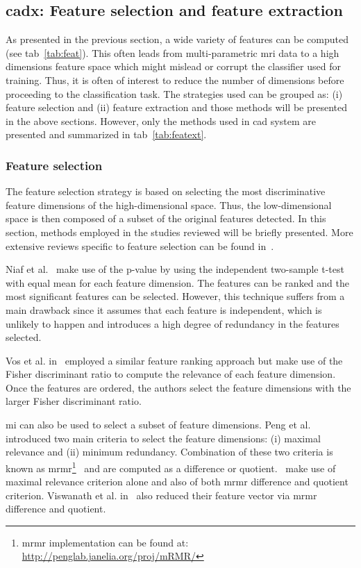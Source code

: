 \subsection{\ac{cadx}: Feature selection and feature extraction} \label{subsec:featureselectionextraction}

As presented in the previous section, a wide variety of features can be computed (see \ac{tab}~\ref{tab:feat}). This often leads from multi-parametric \ac{mri} data to a high dimensions feature space which might mislead or corrupt the classifier used for training. Thus, it is often of interest to reduce the number of dimensions before proceeding to the classification task. The strategies used can be grouped as: (i) feature selection and (ii) feature extraction and those methods will be presented in the above sections. However, only the methods used in \ac{cad} system are presented and summarized in \ac{tab}~\ref{tab:featext}.

\subsubsection{Feature selection}\label{subsubsec:featsel}

The feature selection strategy is based on selecting the most discriminative feature dimensions of the high-dimensional space. Thus, the low-dimensional space is then composed of a subset of the original features detected. In this section, methods employed in the studies reviewed will be briefly presented. More extensive reviews specific to feature selection can be found in~\cite{Saeys2007}.

Niaf et al.~\cite{Niaf2011,Niaf2012} make use of the p-value by using the independent two-sample t-test with equal mean for each feature dimension. The features can be ranked and the most significant features can be selected. However, this technique suffers from a main drawback since it assumes that each feature is independent, which is unlikely to happen and introduces a high degree of redundancy in the features selected.

Vos et al. in~\cite{Vos2012} employed a similar feature ranking approach but make use of the Fisher discriminant ratio to compute the relevance of each feature dimension. Once the features are ordered, the authors select the feature dimensions with the larger Fisher discriminant ratio.

\ac{mi} can also be used to select a subset of feature dimensions. Peng et al. introduced two main criteria to select the feature dimensions: (i) maximal relevance and (ii) minimum redundancy. Combination of these two criteria is known as \ac{mrmr}\footnote{\ac{mrmr} implementation can be found at: \url{http://penglab.janelia.org/proj/mRMR/}}~\cite{Peng2005} and are computed as a difference or quotient.~\cite{Niaf2011,Niaf2012} make use of maximal relevance criterion alone and also of both \ac{mrmr} difference and quotient criterion. Viswanath et al. in~\cite{Viswanath2012} also reduced their feature vector via \ac{mrmr} difference and quotient.

